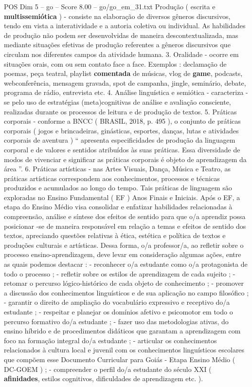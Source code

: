 \begin{textsample}{POS Dim 5 – go – Score 8.00 – go/go\_em\_31.txt}
Produção ( escrita e \textbf{multissemiótica} ) - consiste na elaboração de diversos gêneros discursivos, tendo em vista a interatividade e a autoria coletiva ou individual.
As habilidades de produção não podem ser desenvolvidas de maneira descontextualizada, mas mediante situações efetivas de produção referentes a gêneros discursivos que circulam nos diferentes campos da atividade humana. 3.
Oralidade - ocorre em situações orais, com ou sem contato face a face.
Exemplos : declamação de poemas, peça teatral, playlist \textbf{comentada} de músicas, vlog de \textbf{game}, podcasts, webconferência, mensagem gravada, spot de campanha, jingle, seminário, debate, programa de rádio, entrevista etc. 4.
Análise linguística e semiótica - caracteriza -se pelo uso de estratégias (meta)cognitivas de análise e avaliação consciente, realizadas durante os processos de leitura e de produção de textos. 5.
Práticas corporais - conforme a BNCC ( BRASIL, 2018, p. 495 ), o conjunto de práticas corporais ( jogos e brincadeiras, ginásticas, esportes, danças, lutas e atividades corporais de aventura ) “ apresenta especificidades de produção da linguagem corporal e de valores e sentidos atribuídos às suas práticas.
Essa diversidade de modos de vivenciar e significar as práticas corporais é objeto de aprendizagem da área ”. 6.
Práticas artísticas - nas Artes Visuais, Dança, Música e Teatro, as práticas artísticas correspondem aos conhecimentos, processos e técnicas produzidos e acumulados ao longo do tempo.
Tais práticas de linguagem são exploradas no Ensino Fundamental ( EF ) Anos Finais e Iniciais.
Após o EF, a etapa do Ensino Médio visa consolidar e enfatizar habilidades relacionadas à compreensão, análise e síntese dos efeitos de sentido para que o/a aprendiz possa posicionar -se de maneira responsável em relação a temas e efeitos de sentido dos textos, apreciando questões relativas à ética, estética e política de textos e produções culturais e artísticas.
Dessa forma, o/a professor/a, ao refletir sobre o processo ensino-aprendizagem, deve levar em consideração algumas ações, entre as quais podemos destacar : - reconhecer o/a estudante como o/a protagonista de todo o processo ; - refletir sobre os estilos de aprendizagem de cada sujeito ; - retomar o percurso lógico-histórico de cada objeto de conhecimento ; - promover a discussão dos conhecimentos linguísticos e de sua aplicação no campo filosófico ; - garantir o direito de ampliação do vocabulário expressivo e receptivo do/a estudante ; - respeitar e planejar os domínios afetivo e psicomotor em todo o percurso formativo do/a estudante ; - fazer uso das metodologias ativas, do ensino híbrido e de procedimentos didáticos que garantam a aprendizagem com foco na formação integral do/a estudante ; - articular os conhecimentos relacionados à cultura local e juvenil com os conhecimentos linguísticos escolares que compõem esse Documento Curricular para Goiás - Etapa Ensino Médio ( DC-GOEM ) ; - compreender o perfil do/a estudante do século XXI ( \textbf{afinidades}, estilos cognitivos, dificuldades de aprendizagem etc. ).

\end{textsample}
